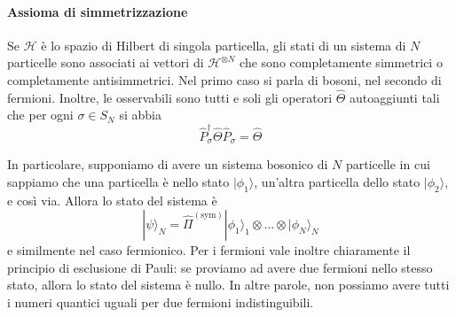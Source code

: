 \documentclass[a4paper, 11pt]{article}
\newcommand{\op}[1]{\hat{#1}}
\renewcommand{\H}{\mathcal{H}}
\renewcommand{\op}[1]{\hat{#1}}
\renewcommand{\ket}[1]{| #1\rangle}
\begin{document}
\paragraph{Assioma di simmetrizzazione} Se $\H$ è lo spazio di Hilbert di singola particella, gli stati di un sistema di $N$ particelle sono associati ai vettori di $\H^{\otimes N}$ che sono completamente simmetrici o completamente antisimmetrici. Nel primo caso si parla di bosoni, nel secondo di fermioni. Inoltre, le osservabili sono tutti e soli gli operatori $\op\Theta$ autoaggiunti tali che per ogni $\sigma\in S_N$ si abbia
\[\op P_\sigma^\dagger\op{\Theta}\op P_\sigma=\op{\Theta}\]

In particolare, supponiamo di avere un sistema bosonico di $N$ particelle in cui sappiamo che una particella è nello stato $\ket{\phi_1}$, un'altra particella dello stato $\ket{\phi_2}$, e così via. Allora lo stato del sistema è
\[\ket{\psi}_N=\op{\Pi}^{(\mathrm{sym})}\ket{\phi_1}_1\otimes\ldots\otimes\ket{\phi_N}_N\]
e similmente nel caso fermionico. Per i fermioni vale inoltre chiaramente il principio di esclusione di Pauli: se proviamo ad avere due fermioni nello stesso stato, allora lo stato del sistema è nullo. In altre parole, non possiamo avere tutti i numeri quantici uguali per due fermioni indistinguibili. 
\end{document}
